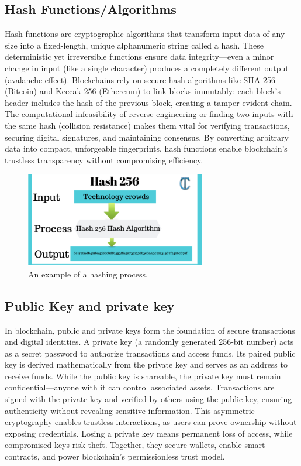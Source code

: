\documentclass[12pt, a4paper]{article}
\begin{document}
\subsection{Hash Functions/Algorithms}
Hash functions are cryptographic algorithms that transform input data of any size into a fixed-length, unique alphanumeric string called a hash. These deterministic yet irreversible functions ensure data integrity—even a minor change in input (like a single character) produces a completely different output (avalanche effect). Blockchains rely on secure hash algorithms like SHA-256 (Bitcoin) and Keccak-256 (Ethereum) to link blocks immutably: each block’s header includes the hash of the previous block, creating a tamper-evident chain. The computational infeasibility of reverse-engineering or finding two inputs with the same hash (collision resistance) makes them vital for verifying transactions, securing digital signatures, and maintaining consensus. By converting arbitrary data into compact, unforgeable fingerprints, hash functions enable blockchain’s trustless transparency without compromising efficiency.
\begin{figure}[h]
    \centering
    \includegraphics[width=0.7\textwidth]{Compute-Hash-256.png}
    \caption{An example of a hashing process.}
    \label{fig:hashing_example}
\end{figure}
\subsection{Public Key and private key}
In blockchain, public and private keys form the foundation of secure transactions and digital identities. A private key (a randomly generated 256-bit number) acts as a secret password to authorize transactions and access funds. Its paired public key is derived mathematically from the private key and serves as an address to receive funds. While the public key is shareable, the private key must remain confidential—anyone with it can control associated assets. Transactions are signed with the private key and verified by others using the public key, ensuring authenticity without revealing sensitive information. This asymmetric cryptography enables trustless interactions, as users can prove ownership without exposing credentials. Losing a private key means permanent loss of access, while compromised keys risk theft. Together, they secure wallets, enable smart contracts, and power blockchain’s permissionless trust model.
\end{document}
